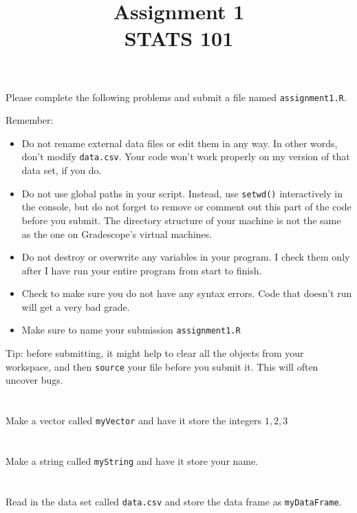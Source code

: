 \documentclass{article}
\title{Assignment 1 \\ STATS 101}
\begin{document}
\maketitle

Please complete the following problems and submit a file named \verb|assignment1.R|.
\newline

Remember:
\begin{itemize}
\item Do not rename external data files or edit them in any way. In other words, don't modify \verb|data.csv|. Your code won't work properly on my version of that data set, if you do.
\item Do not use global paths in your script. Instead, use \verb|setwd()| interactively in the console, but do not forget to remove or comment out this part of the code before you submit. The directory structure of your machine is not the same as the one on Gradescope's virtual machines.
\item Do not destroy or overwrite any variables in your program. I check them only after I have run your entire program from start to finish.
\item Check to make sure you do not have any syntax errors. Code that doesn't run will get a very bad grade. 
\item Make sure to name your submission \verb|assignment1.R|
\end{itemize}

Tip: before submitting, it might help to clear all the objects from your workspace, and then \verb|source| your file before you submit it. This will often uncover bugs.


\section{}
Make a vector called \verb|myVector| and have it store the integers $1,2,3$


\section{}
Make a string called \verb|myString| and have it store your name.

\section{}
Read in the data set called \verb|data.csv| and store the data frame as \verb|myDataFrame|.
\end{document}
